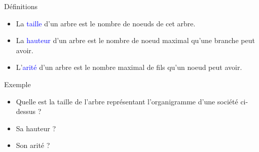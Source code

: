 \documentclass[10pt]{beamer}
\begin{document}
\begin{frame}
	\mframe{\AB}
	\begin{alertblock}{Définitions}
		\begin{itemize}[label=\textbullet]
			\item<1-> La \textcolor{blue}{taille} d'un arbre est le nombre de noeuds de cet arbre. \\
			      \onslide<2->{\begin{small} \textcolor{gray}{L'arbre vide n'a aucun noeud, sa taille est 0.} \end{small}}
			\item<3-> La \textcolor{blue}{hauteur} d'un arbre est le nombre de noeud maximal qu'une branche peut avoir. \\
			      \onslide<4->{\begin{small} \textcolor{gray}{Différentes définitions existent pour la hauteur d'un arbre, on considère parfois que la hauteur est le nombre maximal d'arête que peut avoir une branche.} \end{small}}
			\item<5-> L'\textcolor{blue}{arité} d'un arbre est le nombre maximal de fils qu'un noeud peut avoir. \\
			      \onslide<6->{\begin{small} \textcolor{gray}{On parle aussi de l'arité (ou degré) d'un noeud, il s'agit alors du nombre de fils de ce noeud} \end{small}}
		\end{itemize}
	\end{alertblock}
	\begin{exampleblock}{Exemple}
		\begin{itemize}[label=\textbullet]
			\item<7-> Quelle est la taille de l'arbre représentant l'organigramme d'une société ci-dessus ?
			\item<8-> Sa hauteur ?
			\item<9-> Son arité ?
		\end{itemize}
	\end{exampleblock}
\end{frame}
\end{document}
